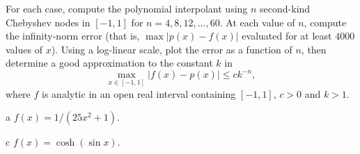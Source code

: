 \begin{statement}{5}
  For each case, compute the polynomial interpolant using $n$ second-kind
  Chebyshev nodes in $[-1, 1]$ for $n = 4, 8, 12, \dots, 60$.
  At each value of $n$, compute the infinity-norm error
  (that is, $\max|p(x) - f(x)|$ evaluated for at least $4000$ values of $x$).
  Using a log-linear scale, plot the error as a function of $n$,
  then determine a good approximation to the constant $k$ in
  \[
    \max_{x \in [-1, 1]} |f(x) - p(x)| \leq c k ^{-n},
  \]
  where $f$ is analytic in an open real interval containing $[-1, 1]$, $c > 0$ and $k > 1$.
\end{statement}

\begin{statement}{a}
  $f(x) = 1 / (25 x^2 + 1)$.
\end{statement}

\begin{statement}{c}
  $f(x) = \cosh(\sin x)$.
\end{statement}